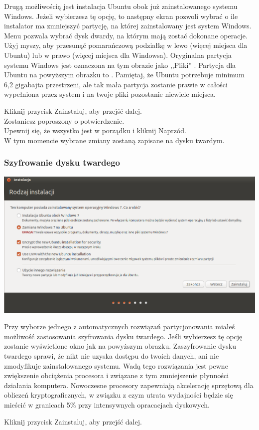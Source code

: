Drugą możliwością jest instalacja Ubuntu obok już zainstalowanego systemu Windows. Jeżeli wybierzesz tę opcję, to następny ekran pozwoli wybrać o ile instalator ma zmniejszyć partycję, na której zainstalowany jest system Windows. Menu  pozwala wybrać dysk dwardy, na którym mają zostać dokonane operacje. Użyj myszy, aby przesunąć pomarańczową podziałkę w lewo (więcej miejsca dla Ubuntu) lub w prawo (więcej miejsca dla Windowsa). Oryginalna partycja systemu Windows jest oznaczona na tym obrazie jako ,,Pliki'' . Partycja dla Ubuntu na powyższym obrazku to . Pamiętaj, że Ubuntu potrzebuje minimum 6,2 gigabajta przestrzeni, ale tak mała partycja zostanie prawie w całości wypełniona przez system i na twoje pliki pozostanie niewiele miejsca.
\begin{flushright}
Kliknij przycisk \textcolor{ubuntu_orange}{Zainstaluj}, aby przejść dalej.\\
Zostaniesz poproszony o potwierdzenie.\\
Upewnij się, że wszystko jest w porządku i kliknij \textcolor{ubuntu_orange}{Naprzód}.\\
W tym momencie wybrane zmiany zostaną zapisane na dysku twardym.
\end{flushright}
\clearpage
\subsubsection{Szyfrowanie dysku twardego}
\begin{center}
	\includegraphics[width=\linewidth]{images/instalator_partycjonowanie_szyfrowanie1.png}
\end{center}

Przy wyborze jednego z automatycznych rozwiązań partycjonowania miałeś możliwość zastosowania szyfrowania dysku twardego. Jeśli wybierzesz tę opcję zostanie wyświetlone okno jak na powyższym obrazku. Zaszyfrowanie dysku twardego sprawi, że nikt nie uzyska dostępu do twoich danych, ani nie zmodyfikuje zainstalowanego systemu. Wadą tego rozwiązania jest pewne zwiększenie obciążenia procesora i związane z tym zmniejszenie płynności działania komputera. Nowoczesne procesory zapewniają akcelerację sprzętową dla obliczeń kryptograficznych, w związku z czym utrata wydajności będzie się mieścić w granicach 5\% przy intensywnych opracacjach dyskowych.
\begin{flushright}
Kliknij przycisk \textcolor{ubuntu_orange}{Zainstaluj}, aby przejść dalej.
\end{flushright}

